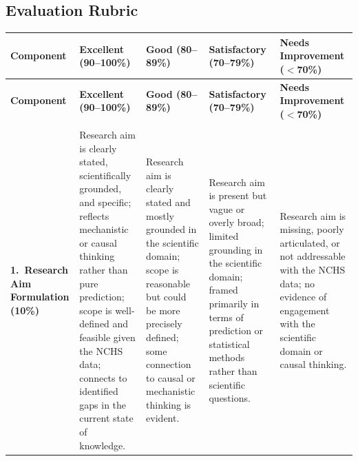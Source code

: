 \begin{landscape}

    \section{Evaluation Rubric}

    {\footnotesize

    \begin{longtable}{%
        >{\RaggedRight\arraybackslash}p{2.5cm}   %
        >{\RaggedRight\arraybackslash}p{4.5cm}   %
        >{\RaggedRight\arraybackslash}p{4.2cm}   %
        >{\RaggedRight\arraybackslash}p{4.2cm}   %
        >{\RaggedRight\arraybackslash}p{4.5cm}}  %

    \toprule
    \textbf{Component} &
    \textbf{Excellent (90--100\%)} &
    \textbf{Good (80--89\%)} &
    \textbf{Satisfactory (70--79\%)} &
    \textbf{Needs Improvement ($<$70\%)} \\
    \midrule
    \endfirsthead

    \toprule
    \textbf{Component} &
    \textbf{Excellent (90--100\%)} &
    \textbf{Good (80--89\%)} &
    \textbf{Satisfactory (70--79\%)} &
    \textbf{Needs Improvement ($<$70\%)} \\
    \midrule
    \endhead

    \midrule
    \multicolumn{5}{r}{\textit{Continued on next page}} \\
    \endfoot

    \bottomrule
    \endlastfoot

    \textbf{1.\ Research Aim Formulation}
    \newline\textbf{(10\%)}
    &
    Research aim is clearly stated, scientifically grounded, and specific;
    reflects mechanistic or causal thinking rather than pure prediction;
    scope is well-defined and feasible given the NCHS data; connects
    to identified gaps in the current state of knowledge.
    &
    Research aim is clearly stated and mostly grounded in the scientific
    domain; scope is reasonable but could be more precisely defined;
    some connection to causal or mechanistic thinking is evident.
    &
    Research aim is present but vague or overly broad; limited grounding
    in the scientific domain; framed primarily in terms of prediction
    or statistical methods rather than scientific questions.
    &
    Research aim is missing, poorly articulated, or not addressable with
    the NCHS data; no evidence of engagement with the scientific domain
    or causal thinking.
    \\
    \midrule


\end{longtable}}
\end{landscape}
